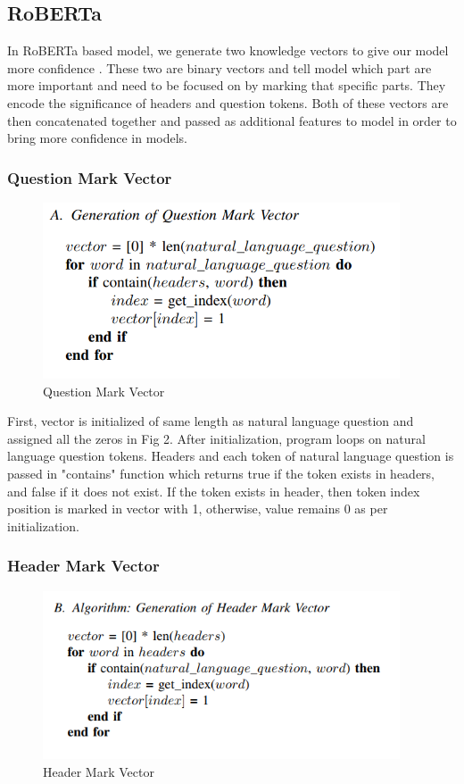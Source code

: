 \documentclass[12pt]{article}
\begin{document}
\subsection{RoBERTa}
In RoBERTa based model, we generate two knowledge vectors to give our model more confidence \cite{pal2021data}. These two are binary vectors and tell model which part are more important and need to be focused on by marking that specific parts. They encode the significance of headers and question tokens. Both of these vectors are then concatenated together and passed as additional features to model in order to bring more confidence in models. 


\subsubsection{Question Mark Vector}
\begin{figure}[H]
    \includegraphics[width=300pt]{QMV}
    \caption{Question Mark Vector}
    \label{fig:Question mark vector}
\end{figure}

First, vector is initialized of same length as natural language question and assigned all the zeros in Fig 2. After initialization, program loops on natural language question tokens. Headers and each token of natural language question is passed in "contains" function which returns true if the token exists in headers, and false if it does not exist. If the token exists in header, then token index position is marked in vector with 1, otherwise, value remains 0 as per initialization. 


\subsubsection{Header Mark Vector}
\begin{figure}[H]
    \includegraphics[width=300pt]{HMV}
    \caption{Header Mark Vector}
    \label{fig:Header mark vector}
\end{figure}
\end{document}
